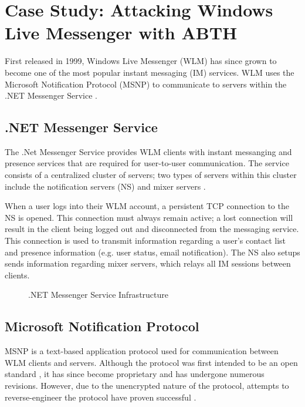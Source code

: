 \documentclass{sig-alternate}
\begin{document}
\section{Case Study: Attacking Windows Live Messenger with ABTH}

First released in 1999, Windows Live Messenger (WLM) has since grown to become one of the most popular instant messaging (IM) services. WLM uses the Microsoft Notification Protocol (MSNP) to communicate to servers within the .NET Messenger Service \cite{piccard:imsecurity}.

\subsection{.NET Messenger Service}

The .Net Messenger Service provides WLM clients with instant messanging and presence services that are required for user-to-user communication. The service consists of a centralized cluster of servers; two types of servers within this cluster include the notification servers (NS) and mixer servers \cite{torre:wlm}.

When a user logs into their WLM account, a persistent TCP connection to the NS is opened. This connection must always remain active; a lost connection will result in the client being logged out and disconnected from the messaging service. 
This connection is used to transmit information regarding a user's contact list and presence information (e.g. user status, email notification).
The NS also setups sends information regarding mixer servers, which relays all IM sessions between clients. 

\begin{figure}[h]
	\centering
	\caption{.NET Messenger Service Infrastructure}
	\label{fig:wlminfrastructure}
\end{figure}

\subsection{Microsoft Notification Protocol}

MSNP is a text-based application protocol used for communication between WLM clients and servers.
Although the protocol was first intended to be an open standard \cite{fout:insidewlm}, it has since become proprietary and has undergone numerous revisions.
However, due to the unencrypted nature of the protocol, attempts to reverse-engineer the protocol have proven successful \cite{hypothetic:msnp, msnfanatic:msnp}.
\end{document}
